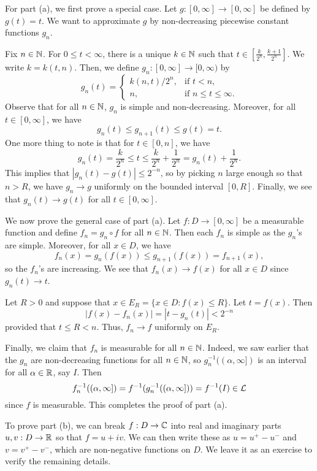 \begin{pf}
    For part (a), we first prove a special case. Let $g : [0, \infty] 
    \to [0, \infty]$ be defined by $g(t) = t$. We want to approximate 
    $g$ by non-decreasing piecewise constant functions $g_n$. 
    
    Fix $n \in \mathbb{N}$. For $0 \leq t < \infty$, there is a unique $k \in \mathbb{N}$ 
    such that $t \in [\frac{k}{2^n}, \frac{k+1}{2^n}]$. We write 
    $k = k(t, n)$. Then, we define $g_n : [0, \infty] \to [0, \infty)$ by 
    \[ g_n(t) = \begin{cases}
        k(n, t)/2^n, & \text{if } t < n, \\ 
        n, & \text{if } n \leq t \leq \infty. 
    \end{cases} \]
    Observe that for all $n \in \mathbb{N}$, $g_n$ is simple and non-decreasing. 
    Moreover, for all $t \in [0, \infty]$, we have 
    \[ g_n(t) \leq g_{n+1}(t) \leq g(t) = t. \] 
    One more thing to note is that for $t \in [0, n]$, we have 
    \[ g_n(t) = \frac{k}{2^n} \leq t \leq \frac{k}{2^n} + \frac{1}{2^n}
    = g_n(t) + \frac{1}{2^n}. \]  
    This implies that $|g_n(t) - g(t)| \leq 2^{-n}$, so by picking 
    $n$ large enough so that $n > R$, we have $g_n \to g$ uniformly on 
    the bounded interval $[0, R]$. Finally, we see that $g_n(t) \to g(t)$ 
    for all $t \in [0, \infty]$. 

    We now prove the general case of part (a). Let $f : D \to [0, \infty]$ 
    be a measurable function and define $f_n = g_n \circ f$ for all 
    $n \in \mathbb{N}$. Then each $f_n$ is simple as the $g_n$'s are simple. 
    Moreover, for all $x \in D$, we have 
    \[ f_n(x) = g_n(f(x)) \leq g_{n+1}(f(x)) = f_{n+1}(x), \] 
    so the $f_n$'s are increasing. We see that $f_n(x) \to f(x)$ for all 
    $x \in D$ since $g_n(t) \to t$. 

    Let $R > 0$ and suppose that $x \in E_R = \{x \in D : f(x) \leq R\}$. 
    Let $t = f(x)$. Then 
    \[ |f(x) - f_n(x)| = |t - g_n(t)| < 2^{-n} \] 
    provided that $t \leq R < n$. Thus, $f_n \to f$ uniformly on $E_R$. 

    Finally, we claim that $f_n$ is measurable for all $n \in \mathbb{N}$. 
    Indeed, we saw earlier that the $g_n$ are non-decreasing functions for all 
    $n \in \mathbb{N}$, so $g_n^{-1}((\alpha, \infty])$ is an interval for all 
    $\alpha \in \mathbb{R}$, say $I$. Then 
    \[ f_n^{-1}((\alpha, \infty]) = f^{-1}(g_n^{-1}((\alpha, \infty])) 
    = f^{-1}(I) \in {\cal L} \] 
    since $f$ is measurable. This completes the proof of part (a). 

    To prove part (b), we can break $f : D \to \mathbb{C}$ into real and imaginary parts 
    $u, v : D \to \mathbb{R}$ so that $f = u + iv$. We can then write these as 
    $u = u^+ - u^-$ and $v = v^+ - v^-$, which are non-negative functions on 
    $D$. We leave it as an exercise to verify the remaining details. 
\end{pf}

